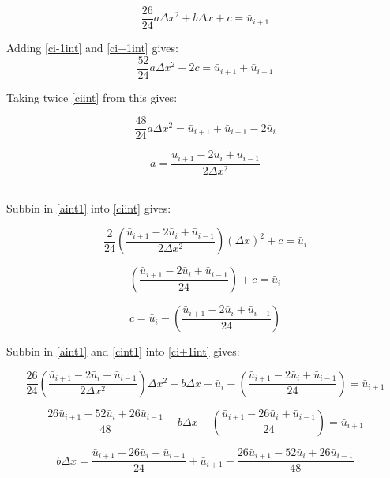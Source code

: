 \documentclass[12pt]{article}
\begin{document}
\begin{dmath}
\label{ci+1int}
\frac{26}{24} a \Delta x^2 + b\Delta x + c = \bar{u}_{i+1}
\end{dmath}

Adding \eqref{ci-1int} and \eqref{ci+1int} gives:
\[\frac{52}{24} a \Delta x^2 + 2c = \bar{u}_{i+1} + \bar{u}_{i-1} \]

Taking twice \eqref{ciint} from this gives:

\[\frac{48}{24} a \Delta x^2 = \bar{u}_{i+1} + \bar{u}_{i-1} - 2\bar{u}_{i} \]

\begin{dmath}
\label{aint1}
a = \frac{\bar{u}_{i+1} - 2\bar{u}_{i} + \bar{u}_{i-1} }{2 \Delta x^2}
\end{dmath}\

Subbin in \eqref{aint1} into \eqref{ciint} gives:

\begin{dmath*}
\frac{2}{24} \left(\frac{\bar{u}_{i+1} - 2\bar{u}_{i} + \bar{u}_{i-1} }{2 \Delta x^2}\right)(\Delta x)^2 + c =\bar{u}_i 
\end{dmath*}

\begin{dmath*}
\left(\frac{\bar{u}_{i+1} - 2\bar{u}_{i} + \bar{u}_{i-1} }{24}\right)+ c =\bar{u}_i 
\end{dmath*}

\begin{dmath}
\label{cint1}
 c = \bar{u}_i - \left(\frac{\bar{u}_{i+1} - 2\bar{u}_{i} + \bar{u}_{i-1} }{24}\right) 
\end{dmath}

Subbin in  \eqref{aint1} and \eqref{cint1} into \ref{ci+1int} gives:

\begin{dmath*}
\frac{26}{24} \left(\frac{\bar{u}_{i+1} - 2\bar{u}_{i} + \bar{u}_{i-1} }{2 \Delta x^2}\right)  \Delta x^2 + b\Delta x + \bar{u}_i - \left(\frac{\bar{u}_{i+1} - 2\bar{u}_{i} + \bar{u}_{i-1} }{24}\right) = \bar{u}_{i+1}
\end{dmath*}

\begin{dmath*}
\frac{26\bar{u}_{i+1} - 52\bar{u}_{i} + 26\bar{u}_{i-1} }{48}  + b\Delta x - \left(\frac{\bar{u}_{i+1} - 26\bar{u}_{i} + \bar{u}_{i-1} }{24}\right) = \bar{u}_{i+1}
\end{dmath*}

\begin{dmath*}
 b\Delta x = \frac{\bar{u}_{i+1} - 26\bar{u}_{i} + \bar{u}_{i-1} }{24} + \bar{u}_{i+1} -  \frac{26\bar{u}_{i+1} - 52\bar{u}_{i} + 26\bar{u}_{i-1} }{48}
\end{dmath*}
\end{document}
